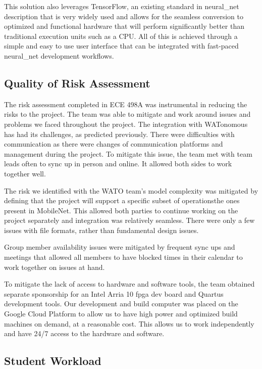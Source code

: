 \documentclass{uw-ece-wkrpt}
\begin{document}
This solution also leverages TensorFlow, an existing standard in \gls{neural_net} description that is very widely used and allows for the seamless conversion to optimized and functional hardware that will perform significantly better than traditional execution units such as a CPU. All of this is achieved through a simple and easy to use user interface that can be integrated with fast-paced \gls{neural_net} development workflows.

\subsection{Quality of Risk Assessment}

The risk assessment completed in ECE 498A was instrumental in reducing the risks to the project. The team was able to mitigate and work around issues and problems we faced throughout the project. The integration with WATonomous has had its challenges, as predicted previously. There were difficulties with communication as there were changes of communication platforms and management during the project. To mitigate this issue, the team met with team leads often to sync up in person and online. It allowed both sides to work together well.

The risk we identified with the WATO team's model complexity was mitigated by defining that the project will support a specific subset of operations\textemdash{}the ones present in MobileNet. This allowed both parties to continue working on the project separately and integration was relatively seamless. There were only a few issues with file formats, rather than fundamental design issues.

Group member availability issues were mitigated by frequent sync ups and meetings that allowed all members to have blocked times in their calendar to work together on issues at hand.

To mitigate the lack of access to hardware and software tools, the team obtained separate sponsorship for an Intel Arria 10 \gls{fpga} dev board and Quartus development tools. Our development and build computer was placed on the Google Cloud Platform to allow us to have high power and optimized build machines on demand, at a reasonable cost. This allows us to work independently and have 24/7 access to the hardware and software.

\subsection{Student Workload}
\end{document}
